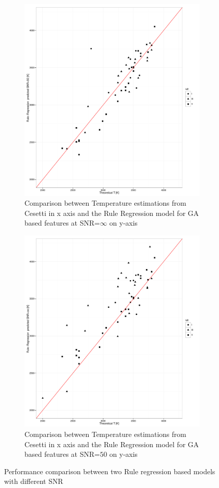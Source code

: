  
\begin {figure}
 \centering 
 \begin{subfigure}{.85\textwidth}
  \centering
  \includegraphics[width=11cm]{figs/irtf_T_rregoo_Cesetti.pdf}
  \caption{Comparison between Temperature estimations from Cesetti 
 in x axis and the Rule Regression model for GA based features 
 at SNR=$\infty$ on y-axis}
 \label{fig:ga_rr00ga_spt}
 \end{subfigure}
\begin{subfigure}{.85\textwidth}
  \centering
  \includegraphics[width=11cm]{figs/irtf_T_rreg50_Cesetti.pdf}
  \caption{Comparison between Temperature estimations from Cesetti 
 in x axis and the Rule Regression model for GA based features 
 at SNR=$50$ on y-axis}
 \label{fig:ga_rr50ga_spt}
 \end{subfigure} 
 \label {fig:comp02}
 \caption{Performance comparison between two Rule regression based models with different SNR}
\end {figure}
%
%

